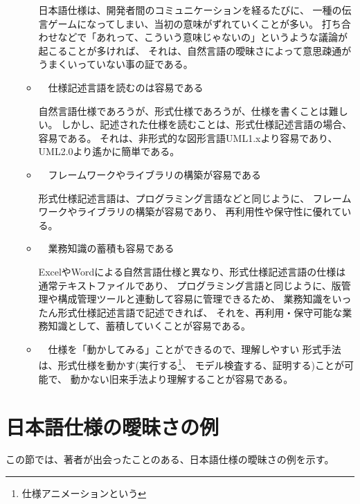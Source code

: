 \begin{itemize}
\begin{itemize}
		日本語仕様は、開発者間のコミュニケーションを経るたびに、
		一種の伝言ゲームになってしまい、当初の意味がずれていくことが多い。
		打ち合わせなどで「あれって、こういう意味じゃないの」というような議論が起こることが多ければ、
		それは、自然言語の曖昧さによって意思疎通がうまくいっていない事の証である。

	\item　仕様記述言語を読むのは容易である

		自然言語仕様であろうが、形式仕様であろうが、仕様を書くことは難しい。
		しかし、記述された仕様を読むことは、形式仕様記述言語の場合、容易である。
		それは、非形式的な図形言語UML1.xより容易であり、UML2.0より遙かに簡単である。

	\item　フレームワークやライブラリの構築が容易である

		形式仕様記述言語は、プログラミング言語などと同じように、
		フレームワークやライブラリの構築が容易であり、
		再利用性や保守性に優れている。

	\item　業務知識の蓄積も容易である


		ExcelやWordによる自然言語仕様と異なり、形式仕様記述言語の仕様は通常テキストファイルであり、
		プログラミング言語と同じように、版管理や構成管理ツールと連動して容易に管理できるため、
		業務知識をいったん形式仕様記述言語で記述できれば、
		それを、再利用・保守可能な業務知識として、蓄積していくことが容易である。
	
	\item　仕様を「動かしてみる」ことができるので、理解しやすい
		形式手法は、形式仕様を動かす(実行する\footnote{仕様アニメーションという}、
		モデル検査する、証明する)ことが可能で、
		動かない旧来手法より理解することが容易である。
	\end{itemize} 
\end{itemize} 


\section {日本語仕様の曖昧さの例}

	この節では、著者が出会ったことのある、日本語仕様の曖昧さの例を示す。

